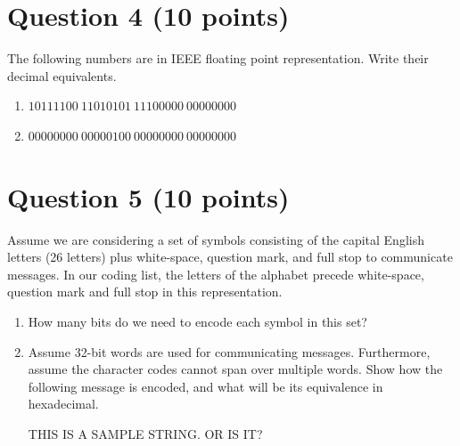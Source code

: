 \documentclass{article}
\begin{document}
	\begin{solution}
	\end{solution}
	
	
	\section*{Question 4 (10 points)}
	The following numbers are in IEEE floating point representation. Write their decimal equivalents.
		\begin{enumerate}
			\item $10111100\  11010101 \ 11100000 \ 00000000$
			\item $00000000\ 00000100 \ 00000000 \ 00000000$
	\end{enumerate}
	
	\begin{solution}
	\end{solution}
	
	
	\section*{Question 5 (10 points)}
	Assume we are considering a set of symbols consisting of the capital English letters (26 letters) plus white-space, question mark, and full stop to communicate messages. In our coding list, the letters of the alphabet precede white-space, question mark and full stop in this representation.
	\begin{enumerate}
		\item How many bits do we need to encode each symbol in this set?
		\item Assume 32-bit words are used for communicating messages. Furthermore, assume the character codes cannot span over multiple words. Show how the following message is encoded, and what will be its equivalence in hexadecimal.
		\begin{center}
			THIS IS A SAMPLE STRING. OR IS IT?
		\end{center}
	\end{enumerate}
	
	\begin{solution}
	\end{solution}
	
\end{document}
